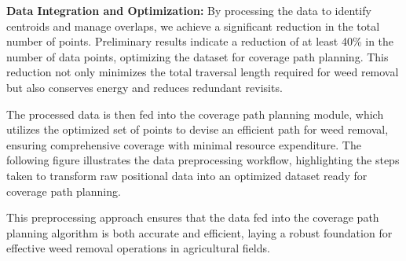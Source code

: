 \textbf{Data Integration and Optimization: }
By processing the data to identify centroids and manage overlaps, we achieve a significant reduction in the total number of points. Preliminary results indicate a reduction of at least 40\% in the number of data points, optimizing the dataset for coverage path planning. This reduction not only minimizes the total traversal length required for weed removal but also conserves energy and reduces redundant revisits.

\vspace{3mm}  


The processed data is then fed into the coverage path planning module, which utilizes the optimized set of points to devise an efficient path for weed removal, ensuring comprehensive coverage with minimal resource expenditure. The following figure illustrates the data preprocessing workflow, highlighting the steps taken to transform raw positional data into an optimized dataset ready for coverage path planning.

\vspace{3mm}  



This preprocessing approach ensures that the data fed into the coverage path planning algorithm is both accurate and efficient, laying a robust foundation for effective weed removal operations in agricultural fields.

